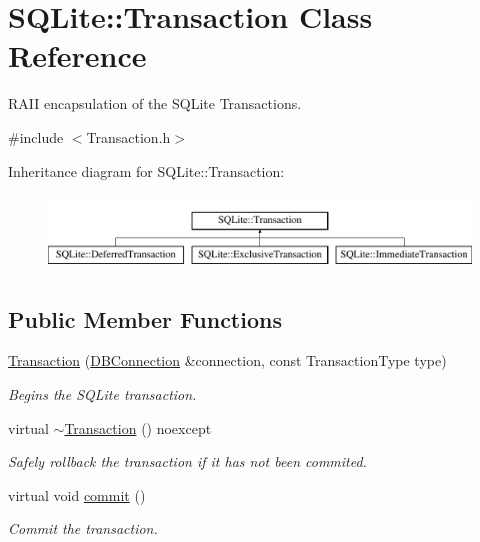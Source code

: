 \hypertarget{class_s_q_lite_1_1_transaction}{\section{S\-Q\-Lite\-:\-:Transaction Class Reference}
\label{class_s_q_lite_1_1_transaction}
}


R\-A\-I\-I encapsulation of the S\-Q\-Lite Transactions.  




{\ttfamily \#include $<$Transaction.\-h$>$}

Inheritance diagram for S\-Q\-Lite\-:\-:Transaction\-:\begin{figure}[H]
\begin{center}
\leavevmode
\includegraphics[height=2.000000cm]{class_s_q_lite_1_1_transaction}
\end{center}
\end{figure}
\subsection*{Public Member Functions}
\begin{DoxyCompactItemize}
\item 
\hyperlink{class_s_q_lite_1_1_transaction_a27add1a1db2dd8cd5935c78a63ad556b}{Transaction} (\hyperlink{class_s_q_lite_1_1_d_b_connection}{D\-B\-Connection} \&connection, const Transaction\-Type type)
\begin{DoxyCompactList}\small\item\em Begins the S\-Q\-Lite transaction. \end{DoxyCompactList}\item 
\hypertarget{class_s_q_lite_1_1_transaction_a43c5e67a10b9698b7f6dad73539feb94}{virtual \hyperlink{class_s_q_lite_1_1_transaction_a43c5e67a10b9698b7f6dad73539feb94}{$\sim$\-Transaction} () noexcept}\label{class_s_q_lite_1_1_transaction_a43c5e67a10b9698b7f6dad73539feb94}

\begin{DoxyCompactList}\small\item\em Safely rollback the transaction if it has not been commited. \end{DoxyCompactList}\item 
\hypertarget{class_s_q_lite_1_1_transaction_a9b251d84198cdc2c0208ad566fec0287}{virtual void \hyperlink{class_s_q_lite_1_1_transaction_a9b251d84198cdc2c0208ad566fec0287}{commit} ()}\label{class_s_q_lite_1_1_transaction_a9b251d84198cdc2c0208ad566fec0287}

\begin{DoxyCompactList}\small\item\em Commit the transaction. \end{DoxyCompactList}\end{DoxyCompactItemize}
